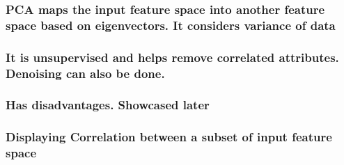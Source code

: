 \documentclass[11pt]{article}
\begin{document}
\hypertarget{pca-maps-the-input-feature-space-into-another-feature-space-based-on-eigenvectors.-it-considers-variance-of-data}{%
\subsubsection{PCA maps the input feature space into another feature
space based on eigenvectors. It considers variance of
data}\label{pca-maps-the-input-feature-space-into-another-feature-space-based-on-eigenvectors.-it-considers-variance-of-data}}

\hypertarget{it-is-unsupervised-and-helps-remove-correlated-attributes.-denoising-can-also-be-done.}{%
\subsubsection{It is unsupervised and helps remove correlated
attributes. Denoising can also be
done.}\label{it-is-unsupervised-and-helps-remove-correlated-attributes.-denoising-can-also-be-done.}}

\hypertarget{has-disadvantages.-showcased-later}{%
\subsubsection{Has disadvantages. Showcased
later}\label{has-disadvantages.-showcased-later}}

    \hypertarget{displaying-correlation-between-a-subset-of-input-feature-space}{%
\subsubsection{Displaying Correlation between a subset of input feature
space}\label{displaying-correlation-between-a-subset-of-input-feature-space}}
\end{document}

